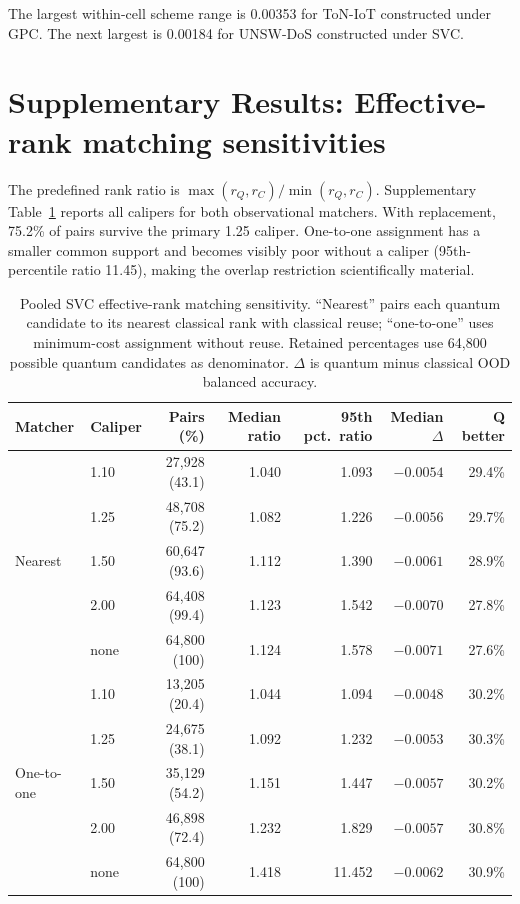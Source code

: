 \documentclass[11pt]{article}
\begin{document}
The largest within-cell scheme range is 0.00353 for ToN-IoT constructed
under GPC. The next largest is 0.00184 for UNSW-DoS constructed under SVC.

\section*{Supplementary Results: Effective-rank matching sensitivities}
\label{supp:rank}

The predefined rank ratio is
$\max(r_Q,r_C)/\min(r_Q,r_C)$. Supplementary Table~\ref{supp:tab_rank} reports all
calipers for both observational matchers. With replacement, 75.2\% of pairs
survive the primary 1.25 caliper. One-to-one assignment has a smaller common
support and becomes visibly poor without a caliper (95th-percentile ratio
11.45), making the overlap restriction scientifically material.

\begin{table}[ht]
\centering
\caption{Pooled SVC effective-rank matching sensitivity. ``Nearest'' pairs
each quantum candidate to its nearest classical rank with classical reuse;
``one-to-one'' uses minimum-cost assignment without reuse. Retained
percentages use 64,800 possible quantum candidates as denominator.
$\Delta$ is quantum minus classical OOD balanced accuracy.}
\label{supp:tab_rank}
\scriptsize
\setlength{\tabcolsep}{3.5pt}
\begin{tabular}{llrrrrr}
\toprule
Matcher & Caliper & Pairs (\%) & Median ratio & 95th pct.\ ratio &
Median $\Delta$ & Q better \\
\midrule
\multirow{5}{*}{Nearest}
 & 1.10 & 27,928 (43.1) & 1.040 & 1.093 & $-0.0054$ & 29.4\% \\
 & 1.25 & 48,708 (75.2) & 1.082 & 1.226 & $-0.0056$ & 29.7\% \\
 & 1.50 & 60,647 (93.6) & 1.112 & 1.390 & $-0.0061$ & 28.9\% \\
 & 2.00 & 64,408 (99.4) & 1.123 & 1.542 & $-0.0070$ & 27.8\% \\
 & none & 64,800 (100) & 1.124 & 1.578 & $-0.0071$ & 27.6\% \\
\midrule
\multirow{5}{*}{One-to-one}
 & 1.10 & 13,205 (20.4) & 1.044 & 1.094 & $-0.0048$ & 30.2\% \\
 & 1.25 & 24,675 (38.1) & 1.092 & 1.232 & $-0.0053$ & 30.3\% \\
 & 1.50 & 35,129 (54.2) & 1.151 & 1.447 & $-0.0057$ & 30.2\% \\
 & 2.00 & 46,898 (72.4) & 1.232 & 1.829 & $-0.0057$ & 30.8\% \\
 & none & 64,800 (100) & 1.418 & 11.452 & $-0.0062$ & 30.9\% \\
\bottomrule
\end{tabular}
\end{table}
\end{document}
